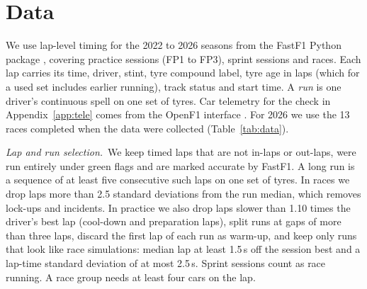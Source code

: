 \section{Data}\label{sec:data}

We use lap-level timing for the 2022 to 2026 seasons from the FastF1 Python package \citep[version 3.8.3]{schaefer2026fastf1}, covering practice sessions (FP1 to FP3), sprint sessions and races.
Each lap carries its time, driver, stint, tyre compound label, tyre age in laps (which for a used set includes earlier running), track status and start time.
A \emph{run} is one driver's continuous spell on one set of tyres.
Car telemetry for the check in Appendix~\ref{app:tele} comes from the OpenF1 interface \citep{openf12026}.
For 2026 we use the 13 races completed when the data were collected (Table~\ref{tab:data}).

\begin{table}[t]
\centering\small

\caption{Data used. Italic rows are panel headings. Race-fit laps are green-flag laps in runs of at least five laps. Practice and sprint runs are those classified as race simulations (Section~\ref{sec:data}). Season rows use hard, medium and soft labels. The pooled 2022--26 fit of Section~\ref{sec:rates} uses physical compounds C1 to C5 and so omits the C6 soft tyre of the 2025 Monaco race, leaving \PooledNLaps{} laps in \PooledNRuns{} runs.}
\label{tab:data}
\end{table}

\medskip\noindent\textit{Lap and run selection.}\ We keep timed laps that are not in-laps or out-laps, were run entirely under green flags and are marked accurate by FastF1.
A long run is a sequence of at least five consecutive such laps on one set of tyres.
In races we drop laps more than 2.5 standard deviations from the run median, which removes lock-ups and incidents.
In practice we also drop laps slower than 1.10 times the driver's best lap (cool-down and preparation laps), split runs at gaps of more than three laps, discard the first lap of each run as warm-up, and keep only runs that look like race simulations: median lap at least 1.5\,s off the session best and a lap-time standard deviation of at most 2.5\,s.
Sprint sessions count as race running.
A race group needs at least four cars on the lap.


